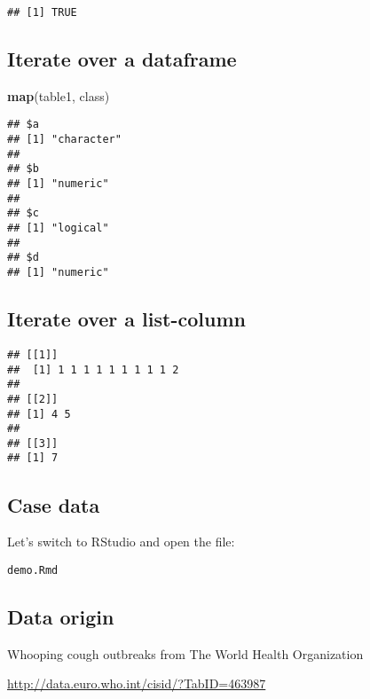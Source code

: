 \documentclass[]{article}
\newenvironment{Shaded}{\begin{snugshade}}{\end{snugshade}}
\newcommand{\KeywordTok}[1]{\textcolor[rgb]{0.13,0.29,0.53}{\textbf{#1}}}
\newcommand{\OperatorTok}[1]{\textcolor[rgb]{0.81,0.36,0.00}{\textbf{#1}}}
\newcommand{\NormalTok}[1]{#1}
\begin{document}
\begin{verbatim}
## [1] TRUE
\end{verbatim}

\subsection{Iterate over a dataframe}\label{iterate-over-a-dataframe}

\begin{Shaded}
\begin{Highlighting}[]
\KeywordTok{map}\NormalTok{(table1, class)}
\end{Highlighting}
\end{Shaded}

\begin{verbatim}
## $a
## [1] "character"
## 
## $b
## [1] "numeric"
## 
## $c
## [1] "logical"
## 
## $d
## [1] "numeric"
\end{verbatim}

\subsection{Iterate over a
list-column}\label{iterate-over-a-list-column}

\begin{Shaded}
\end{Shaded}

\begin{verbatim}
## [[1]]
##  [1] 1 1 1 1 1 1 1 1 1 2
## 
## [[2]]
## [1] 4 5
## 
## [[3]]
## [1] 7
\end{verbatim}

\subsection{Case data}\label{case-data}

Let's switch to RStudio and open the file:

\texttt{demo.Rmd}

\subsection{Data origin}\label{data-origin}

Whooping cough outbreaks from The World Health Organization

\url{http://data.euro.who.int/cisid/?TabID=463987}
\end{document}

